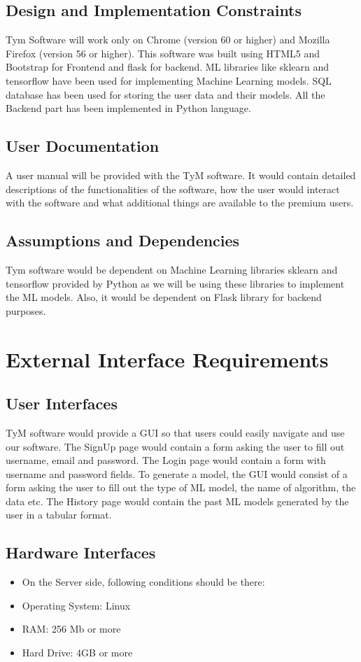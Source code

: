 \documentclass{scrreprt}
\begin{document}
\section{Design and Implementation Constraints}
Tym Software will work only on Chrome (version 60 or higher) and Mozilla Firefox (version 56 or higher). This software was built using HTML5 and Bootstrap for Frontend and flask for backend. ML libraries like sklearn and tensorflow have been used for implementing Machine Learning models. SQL database has been used for storing the user data and their models. All the Backend part has been implemented in Python language.

\section{User Documentation}
A user manual will be provided with the TyM software. It would contain detailed descriptions of the functionalities of the software, how the user would interact with the software and what additional things are available to the premium users.

\section{Assumptions and Dependencies}
Tym software would be dependent on Machine Learning libraries sklearn and tensorflow provided by Python as we will be using these libraries to implement the ML models. Also, it would be dependent on Flask library for backend purposes.


\chapter{External Interface Requirements}

\section{User Interfaces}
TyM software would provide a GUI so that users could easily navigate and use our software. The SignUp page would contain a form asking the user to fill out username, email and password. The Login page would contain a form with username and password fields. To generate a model, the GUI would consist of a form asking the user to fill out the type of ML model, the name of algorithm, the data etc. The History page would contain the past ML models generated by the user in a tabular format. 

\section{Hardware Interfaces}
\begin{itemize}
\item On the Server side, following conditions should be there:
\item Operating System: Linux
\item RAM: 256 Mb or more
\item Hard Drive: 4GB or more
\end{itemize}
\end{document}
